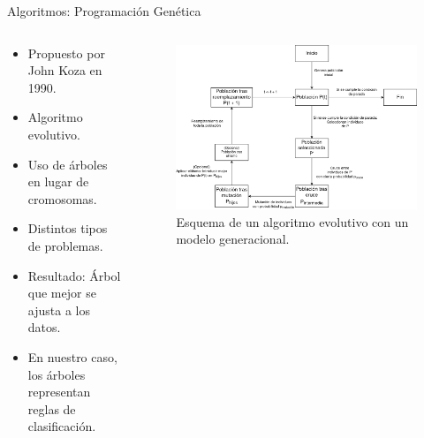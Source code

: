\documentclass{beamer}
\begin{document}
\begin{frame}{Algoritmos: Programación Genética}

	\begin{columns}[T]

		\begin{column}{.4\textwidth}
			\begin{itemize}
				\item Propuesto por John Koza en 1990.
				\item Algoritmo evolutivo.
				\item Uso de árboles en lugar de cromosomas.
				\item Distintos tipos de problemas.
				\item Resultado: Árbol que mejor se ajusta a los datos.
				\item En nuestro caso, los árboles representan reglas de clasificación.
			\end{itemize}
		\end{column}


		\begin{column}{.6\textwidth}
			\begin{figure}[H]
			    \centering
				 \includegraphics[width=\textwidth]{generacional.png}
			    \caption{Esquema de un algoritmo evolutivo con un modelo generacional.}
				 \label{fig:modelo_generacioal}
			\end{figure}
		\end{column}

	\end{columns}

\end{frame}
\end{document}
